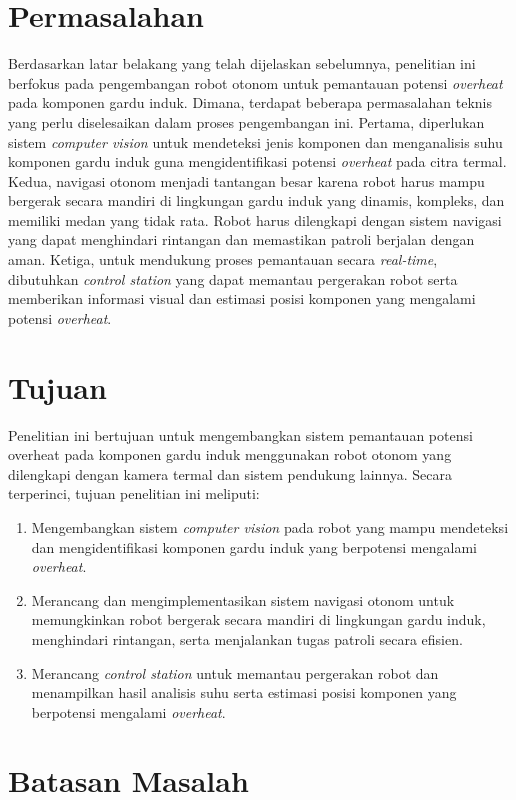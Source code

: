\section{Permasalahan}
Berdasarkan latar belakang yang telah dijelaskan sebelumnya, penelitian ini berfokus pada pengembangan robot otonom untuk pemantauan potensi \emph{overheat} pada komponen gardu induk. Dimana, terdapat beberapa permasalahan teknis yang perlu diselesaikan dalam proses pengembangan ini. Pertama, diperlukan sistem \emph{computer vision} untuk mendeteksi jenis komponen dan menganalisis suhu komponen gardu induk guna mengidentifikasi potensi \emph{overheat} pada citra termal. Kedua, navigasi otonom menjadi tantangan besar karena robot harus mampu bergerak secara mandiri di lingkungan gardu induk yang dinamis, kompleks, dan memiliki medan yang tidak rata. Robot harus dilengkapi dengan sistem navigasi yang dapat menghindari rintangan dan memastikan patroli berjalan dengan aman. Ketiga, untuk mendukung proses pemantauan secara \emph{real-time}, dibutuhkan \emph{control station} yang dapat memantau pergerakan robot serta memberikan informasi visual dan estimasi posisi komponen yang mengalami potensi \emph{overheat}.


\section{Tujuan}
\label{sec:Tujuan}
Penelitian ini bertujuan untuk mengembangkan sistem pemantauan potensi overheat pada komponen gardu induk menggunakan robot otonom yang dilengkapi dengan kamera termal dan sistem pendukung lainnya. Secara terperinci, tujuan penelitian ini meliputi:
\begin{enumerate}
      \item Mengembangkan sistem \emph{computer vision} pada robot yang mampu mendeteksi dan mengidentifikasi komponen gardu induk yang berpotensi mengalami \emph{overheat}.
      \item Merancang dan mengimplementasikan sistem navigasi otonom untuk memungkinkan robot bergerak secara mandiri di lingkungan gardu induk, menghindari rintangan, serta menjalankan tugas patroli secara efisien.
      \item Merancang \emph{control station} untuk memantau pergerakan robot dan menampilkan hasil analisis suhu serta estimasi posisi komponen yang berpotensi mengalami \emph{overheat}.
\end{enumerate}

\newpage


\section{Batasan Masalah}
\label{sec:batasanmasalah}

